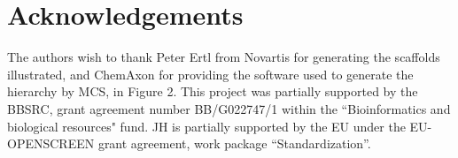\documentclass[10pt]{bmc_article}
\newenvironment{bmcformat}{\baselineskip20pt\sloppy\setboolean{publ}{false}}{\baselineskip20pt\sloppy}
\begin{document}
\begin{bmcformat}
    

\section*{Acknowledgements}
The authors wish to thank Peter Ertl from Novartis for generating the scaffolds illustrated, and ChemAxon for providing the software used to generate the hierarchy by MCS, in Figure 2. This project was partially supported by the BBSRC, grant agreement number BB/G022747/1 within the ``Bioinformatics and biological resources" fund. JH is partially supported by the EU under the EU-OPENSCREEN grant agreement, work package ``Standardization''. 
 

\newpage
{
   }     %






\end{bmcformat}
\end{document}
